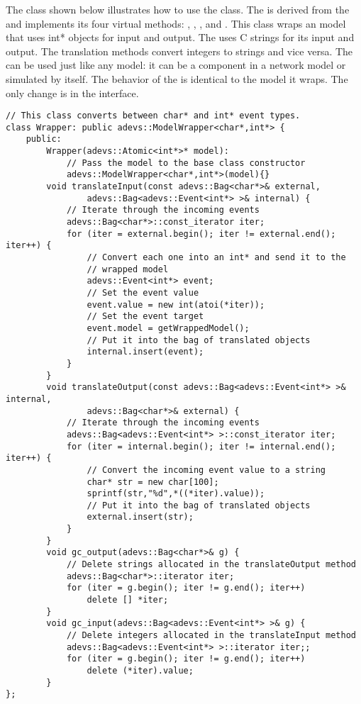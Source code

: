 The  class shown below illustrates how to use the  class. The  is derived from the  and implements its four virtual methods: , , , and . This class wraps an  model that uses int* objects for input and output. The  uses C strings for its input and output. The translation methods convert integers to strings and vice versa. The  can be used just like any  model: it can be a component in a network model or simulated by itself. The behavior of the  is identical to the model it wraps. The only change is in the interface.
\begin{verbatim}
// This class converts between char* and int* event types.
class Wrapper: public adevs::ModelWrapper<char*,int*> {
    public:
        Wrapper(adevs::Atomic<int*>* model):
            // Pass the model to the base class constructor
            adevs::ModelWrapper<char*,int*>(model){}
        void translateInput(const adevs::Bag<char*>& external,
                adevs::Bag<adevs::Event<int*> >& internal) {
            // Iterate through the incoming events
            adevs::Bag<char*>::const_iterator iter;
            for (iter = external.begin(); iter != external.end(); iter++) {
                // Convert each one into an int* and send it to the
                // wrapped model
                adevs::Event<int*> event;
                // Set the event value
                event.value = new int(atoi(*iter));
                // Set the event target
                event.model = getWrappedModel();
                // Put it into the bag of translated objects
                internal.insert(event);
            }
        }
        void translateOutput(const adevs::Bag<adevs::Event<int*> >& internal,
                adevs::Bag<char*>& external) {
            // Iterate through the incoming events
            adevs::Bag<adevs::Event<int*> >::const_iterator iter;
            for (iter = internal.begin(); iter != internal.end(); iter++) {
                // Convert the incoming event value to a string
                char* str = new char[100];
                sprintf(str,"%d",*((*iter).value));
                // Put it into the bag of translated objects
                external.insert(str);
            }
        }
        void gc_output(adevs::Bag<char*>& g) {
            // Delete strings allocated in the translateOutput method
            adevs::Bag<char*>::iterator iter;
            for (iter = g.begin(); iter != g.end(); iter++)
                delete [] *iter;
        }
        void gc_input(adevs::Bag<adevs::Event<int*> >& g) {
            // Delete integers allocated in the translateInput method
            adevs::Bag<adevs::Event<int*> >::iterator iter;;
            for (iter = g.begin(); iter != g.end(); iter++)
                delete (*iter).value;
        }
};
\end{verbatim}
